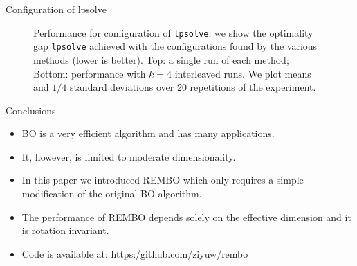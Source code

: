 \documentclass[final]{beamer}
\begin{document}
\begin{frame}[t]
\begin{columns}[T]
\begin{column}{.48\textwidth}
\begin{block}{Configuration of lpsolve}
\begin{figure}[h!]
\begin{center}
  \caption{Performance for configuration of \texttt{lpsolve}; we show the optimality gap \texttt{lpsolve} achieved with the configurations found by the various methods (lower is better). Top: a single run of each method; Bottom: performance with $k=4$ interleaved runs. We plot means and $1/4$ standard deviations over 20 repetitions of the experiment.
        }
\label{fig:lpsolve}
\end{center}
\end{figure}
\end{block}


\begin{block}{Conclusions}
 \begin{itemize}
   \item BO is a very efficient algorithm and has many applications.
   \item It, however, is limited to moderate dimensionality.
   \item In this paper we introduced REMBO which only requires a simple modification of the original BO algorithm.
   \item The performance of REMBO depends solely on the effective dimension and it is rotation invariant.
   \item Code is available at: https:/github.com/ziyuw/rembo
  \end{itemize}
\end{block}



\end{column}
\end{columns}
\end{frame}
\end{document}
